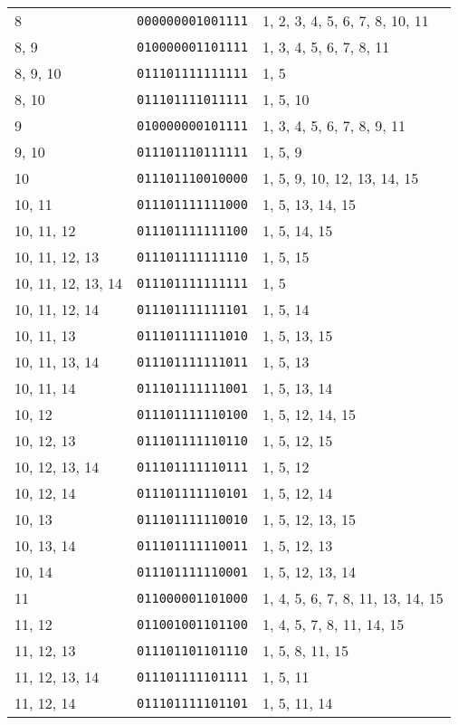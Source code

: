 \documentclass[a4paper,12pt]{article}
\begin{document}
\begin{longtable}{l|l|l}
        8&\texttt{000000001001111}&1, 2, 3, 4, 5, 6, 7, 8, 10, 11\\
        8, 9&\texttt{010000001101111}&1, 3, 4, 5, 6, 7, 8, 11\\
        8, 9, 10&\texttt{011101111111111}&1, 5\\
        8, 10&\texttt{011101111011111}&1, 5, 10\\
        9&\texttt{010000000101111}&1, 3, 4, 5, 6, 7, 8, 9, 11\\
        9, 10&\texttt{011101110111111}&1, 5, 9\\
        10&\texttt{011101110010000}&1, 5, 9, 10, 12, 13, 14, 15\\
        10, 11&\texttt{011101111111000}&1, 5, 13, 14, 15\\
        10, 11, 12&\texttt{011101111111100}&1, 5, 14, 15\\
        10, 11, 12, 13&\texttt{011101111111110}&1, 5, 15\\
        10, 11, 12, 13, 14&\texttt{011101111111111}&1, 5\\
        10, 11, 12, 14&\texttt{011101111111101}&1, 5, 14\\
        10, 11, 13&\texttt{011101111111010}&1, 5, 13, 15\\
        10, 11, 13, 14&\texttt{011101111111011}&1, 5, 13\\
        10, 11, 14&\texttt{011101111111001}&1, 5, 13, 14\\
        10, 12&\texttt{011101111110100}&1, 5, 12, 14, 15\\
        10, 12, 13&\texttt{011101111110110}&1, 5, 12, 15\\
        10, 12, 13, 14&\texttt{011101111110111}&1, 5, 12\\
        10, 12, 14&\texttt{011101111110101}&1, 5, 12, 14\\
        10, 13&\texttt{011101111110010}&1, 5, 12, 13, 15\\
        10, 13, 14&\texttt{011101111110011}&1, 5, 12, 13\\
        10, 14&\texttt{011101111110001}&1, 5, 12, 13, 14\\
        11&\texttt{011000001101000}&1, 4, 5, 6, 7, 8, 11, 13, 14, 15\\
        11, 12&\texttt{011001001101100}&1, 4, 5, 7, 8, 11, 14, 15\\
        11, 12, 13&\texttt{011101101101110}&1, 5, 8, 11, 15\\
        11, 12, 13, 14&\texttt{011101111101111}&1, 5, 11\\
        11, 12, 14&\texttt{011101111101101}&1, 5, 11, 14\\

\end{longtable}
\end{document}
